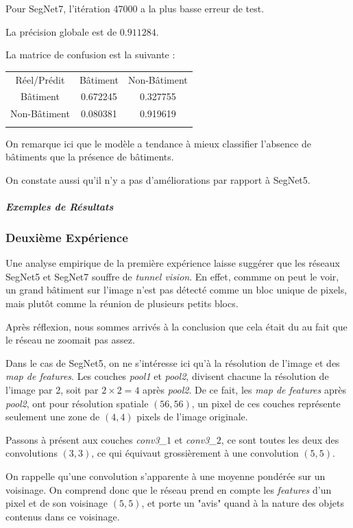 \documentclass[a4paper, 11pt]{report}
\begin{document}
Pour SegNet7, l'itération 47000 a la plus basse erreur de test.

La précision globale est de $0.911284$.

La matrice de confusion est la suivante :
\begin{center}
\begin{tabularx}{0.5\textwidth}{c|c c|}
	Réel/Prédit & Bâtiment & \multicolumn{1}{c}{Non-Bâtiment} \\
	\hhline{---}
	Bâtiment & 0.672245 \cellcolor[gray]{.8} & 0.327755 \\
	Non-Bâtiment & 0.080381 & 0.919619 \cellcolor[gray]{.8}\\
	\hhline{~--}
\end{tabularx}
\end{center}

On remarque ici que le modèle a tendance à mieux classifier l'absence de bâtiments que la présence de bâtiments.

On constate aussi qu'il n'y a pas d'améliorations par rapport à SegNet5.

\subparagraph{Exemples de Résultats}


\subsubsection{Deuxième Expérience}
Une analyse empirique de la première expérience laisse suggérer que les réseaux SegNet5 et SegNet7 souffre de \emph{tunnel vision}.
En effet, commme on peut le voir, un grand bâtiment sur l'image n'est pas détecté comme un bloc unique de pixels, mais plutôt comme la réunion de plusieurs petits blocs.

Après réflexion, nous sommes arrivés à la conclusion que cela était du au fait que le réseau ne zoomait pas assez.

Dans le cas de SegNet5, on ne s'intéresse ici qu'à la résolution de l'image et des \emph{map de features}.
Les couches \emph{pool1} et \emph{pool2}, divisent chacune la résolution de l'image par 2, soit par $2 \times 2 = 4$ après \emph{pool2}.
De ce fait, les \emph{map de features} après \emph{pool2}, ont pour résolution spatiale $(56, 56)$, un pixel de ces couches représente seulement une zone de $(4, 4)$ pixels de l'image originale.

Passons à présent aux couches \emph{conv3\_$1$} et \emph{conv3\_$2$}, ce sont toutes les deux des convolutions $(3, 3)$, ce qui équivaut grossièrement à une convolution $(5, 5)$.

On rappelle qu'une convolution s'apparente à une moyenne pondérée sur un voisinage. On comprend donc que le réseau prend en compte les \emph{features} d'un pixel et de son voisinage $(5, 5)$, et porte un "avis" quand à la nature des objets contenus dans ce voisinage.
\end{document}

